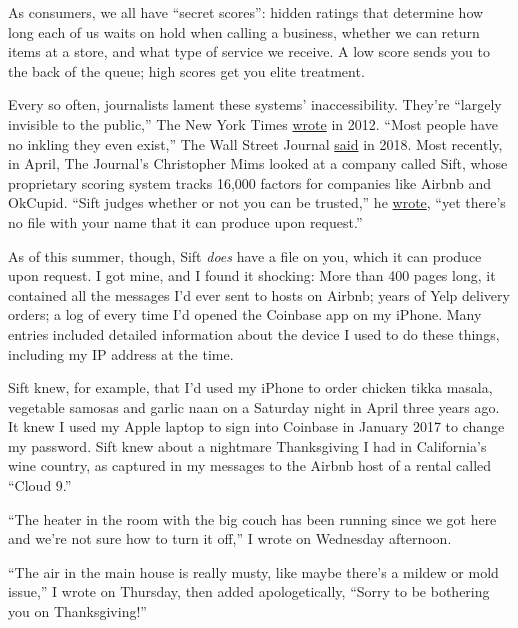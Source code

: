 As consumers, we all have ``secret scores'': hidden ratings that
determine how long each of us waits on hold when calling a business,
whether we can return items at a store, and what type of service we
receive. A low score sends you to the back of the queue; high scores get
you elite treatment.

Every so often, journalists lament these systems' inaccessibility.
They're ``largely invisible to the public,'' The New York Times
\href{https://www.nytimes.com/2012/08/19/business/electronic-scores-rank-consumers-by-potential-value.html}{wrote}
in 2012. ``Most people have no inkling they even exist,'' The Wall
Street Journal
\href{https://www.wsj.com/articles/on-hold-for-45-minutes-it-might-be-your-secret-customer-score-1541084656}{said}
in 2018. Most recently, in April, The Journal's Christopher Mims looked
at a company called Sift, whose proprietary scoring system tracks 16,000
factors for companies like Airbnb and OkCupid. ``Sift judges whether or
not you can be trusted,'' he
\href{https://www.wsj.com/articles/the-secret-trust-scores-companies-use-to-judge-us-all-11554523206}{wrote},
``yet there's no file with your name that it can produce upon request.''

As of this summer, though, Sift \emph{does} have a file on you, which it
can produce upon request. I got mine, and I found it shocking: More than
400 pages long, it contained all the messages I'd ever sent to hosts on
Airbnb; years of Yelp delivery orders; a log of every time I'd opened
the Coinbase app on my iPhone. Many entries included detailed
information about the device I used to do these things, including my IP
address at the time.

Sift knew, for example, that I'd used my iPhone to order chicken tikka
masala, vegetable samosas and garlic naan on a Saturday night in April
three years ago. It knew I used my Apple laptop to sign into Coinbase in
January 2017 to change my password. Sift knew about a nightmare
Thanksgiving I had in California's wine country, as captured in my
messages to the Airbnb host of a rental called ``Cloud 9.''

``The heater in the room with the big couch has been running since we
got here and we're not sure how to turn it off,'' I wrote on Wednesday
afternoon.

``The air in the main house is really musty, like maybe there's a mildew
or mold issue,'' I wrote on Thursday, then added apologetically, ``Sorry
to be bothering you on Thanksgiving!''

